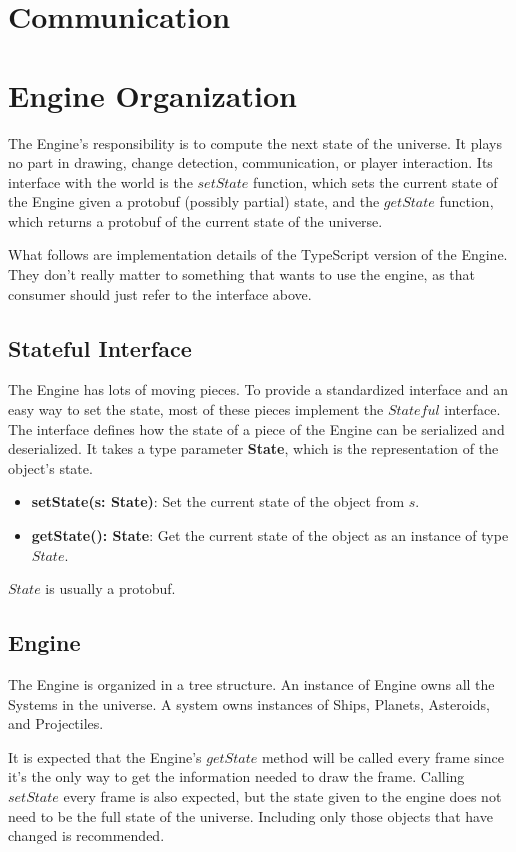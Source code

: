 \documentclass{article}
\begin{document}
\section{Communication} \label{communication}


\section{Engine Organization}
The Engine's responsibility is to compute the next state of the universe. It plays no part in drawing, change detection, communication, or player interaction. Its interface with the world is the $setState$ function, which sets the current state of the Engine given a protobuf (possibly partial) state, and the $getState$ function, which returns a protobuf of the current state of the universe.

What follows are implementation details of the TypeScript version of the Engine. They don't really matter to something that wants to use the engine, as that consumer should just refer to the interface above.

\subsection{Stateful Interface}
The Engine has lots of moving pieces. To provide a standardized interface and an easy way to set the state, most of these pieces implement the $Stateful$ interface. The interface defines how the state of a piece of the Engine can be serialized and deserialized. It takes a type parameter \textbf{State}, which is the representation of the object's state.

\begin{itemize}
\item[]\textbf{setState(s: State)}: Set the current state of the object from $s$.
\item[]\textbf{getState(): State}: Get the current state of the object as an instance of type $State$.
\end{itemize}

$State$ is usually a protobuf.


\subsection{Engine}
The Engine is organized in a tree structure. An instance of Engine owns all the Systems in the universe. A system owns instances of Ships, Planets, Asteroids, and Projectiles.

It is expected that the Engine's $getState$ method will be called every frame since it's the only way to get the information needed to draw the frame. Calling $setState$ every frame is also expected, but the state given to the engine does not need to be the full state of the universe. Including only those objects that have changed is recommended.
\end{document}
